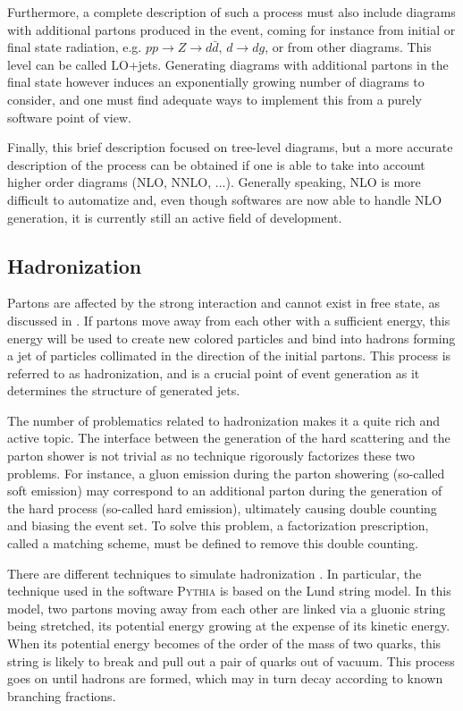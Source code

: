     Furthermore, a complete description of such a process must also include
    diagrams with additional partons produced in the event, coming for instance
    from initial or final state radiation, e.g. $pp \rightarrow Z \rightarrow
    d\bar{d}$, $d\rightarrow dg$, or from other diagrams. This level can be
    called LO+jets. Generating diagrams with additional partons in the final
    state however induces an exponentially growing number of diagrams to
    consider, and one must find adequate ways to implement this from a purely
    software point of view.

    Finally, this brief description focused on tree-level diagrams, but a more
    accurate description of the process can be obtained if one is able to take
    into account higher order diagrams (NLO, NNLO, ...). Generally speaking, NLO
    is more difficult to automatize and, even though softwares are now able to
    handle NLO generation, it is currently still an active field of development.

    \subsection{Hadronization}

    Partons are affected by the strong interaction and cannot exist in free
    state, as discussed in . If partons move
    away from each other with a sufficient energy, this energy will be used to
    create new colored particles and bind into hadrons forming a jet of
    particles collimated in the direction of the initial partons. This process
    is referred to as hadronization, and is a crucial point of event generation
    as it determines the structure of generated jets.

    The number of problematics related to hadronization makes it a quite rich
    and active topic. The interface between the generation of the hard
    scattering and the parton shower is not trivial as no technique rigorously
    factorizes these two problems. For instance, a gluon emission during the
    parton showering (so-called soft emission) may correspond to an additional
    parton during the generation of the hard process (so-called hard emission),
    ultimately causing double counting and biasing the event set. To solve this
    problem, a factorization prescription, called a matching scheme, must be
    defined to remove this double counting.

    There are different techniques to simulate hadronization \cite{MCGenPDG}. In
    particular, the technique used in the software \textsc{Pythia} is based on
    the Lund string model. In this model, two partons moving away from each
    other are linked via a gluonic string being stretched, its potential energy
    growing at the expense of its kinetic energy. When its potential energy
    becomes of the order of the mass of two quarks, this string is likely to
    break and pull out a pair of quarks out of vacuum. This process goes on
    until hadrons are formed, which may in turn decay according to known
    branching fractions.

